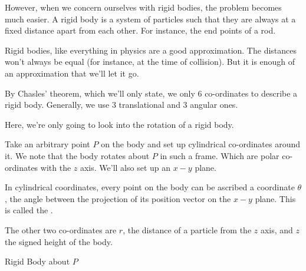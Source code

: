However, when we concern ourselves with rigid bodies, the problem becomes
much easier. A rigid body is a system of particles such that they are 
always at a fixed distance apart from each other. For instance, 
the end points of a rod.

Rigid bodies, like everything in physics are a good approximation. 
The distances won't always be equal (for instance, at the time of collision).
But it is enough of an approximation that we'll let it go.

By Chasles' theorem, which we'll only state, we only \(6\) co-ordinates to 
describe a rigid body. Generally, we use \(3\) translational and \(3\) angular
ones.

Here, we're only going to look into the rotation of a rigid body.

Take an arbitrary point \(P\) on the body and set up cylindrical co-ordinates around it.
We note that the body rotates about \(P\) in such a frame.
Which are polar co-ordinates with the \(z\) axis. We'll also set up an \(x-y\)
plane. 

In cylindrical coordinates, every point on the body can be ascribed a
coordinate \(θ\), the angle between the projection of its position vector on the 
\(x-y\) plane. This is called the .

The other two co-ordinates are \(r\), the distance of a particle from the 
\(z\) axis, and \(z\) the signed height of the body.

\begin{marginfigure}
    \centering
    \caption{Rigid Body about \(P\)}
\end{marginfigure}

